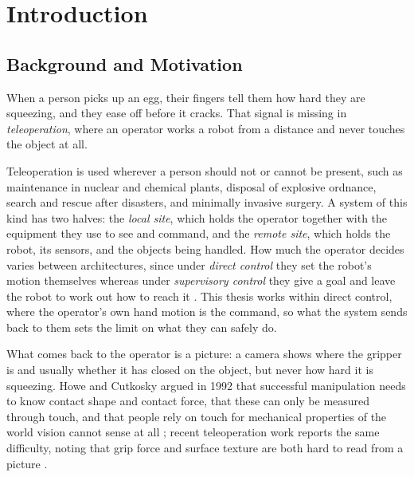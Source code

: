 \documentclass[12pt, a4paper, twoside, openright]{report}
\begin{document}
\tableofcontents
\cleardoublepage
\listoffigures
\cleardoublepage
\listoftables
\cleardoublepage

\setcounter{page}{1}

\chapter{Introduction}
\label{ch:introduction}

\section{Background and Motivation}
\label{sec:background}

When a person picks up an egg, their fingers tell them how hard they are
squeezing, and they ease off before it cracks. That signal is missing in
\emph{teleoperation}, where an operator works a robot from a distance and never
touches the object at all.

Teleoperation is used wherever a person should not or cannot be present, such
as maintenance in nuclear and chemical plants, disposal of explosive ordnance,
search and rescue after disasters, and minimally invasive surgery. A system of
this kind has two halves: the \emph{local site}, which holds the operator
together with the equipment they use to see and command, and the \emph{remote
    site}, which holds the robot, its sensors, and the objects being handled. How
much the operator decides varies between architectures, since under
\emph{direct control} they set the robot's motion themselves whereas under
\emph{supervisory control} they give a goal and leave the robot to work out
how to reach it \cite{niemeyer2016}. This thesis works within direct control,
where the operator's own hand motion is the command, so what the system sends
back to them sets the limit on what they can safely do.

What comes back to the operator is a picture: a camera shows where the gripper
is and usually whether it has closed on the object, but never how hard it is
squeezing. Howe and Cutkosky argued in 1992 that successful manipulation needs
to know contact shape and contact force, that these can only be measured
through touch, and that people rely on touch for mechanical properties of the
world vision cannot sense at all \cite{howe1992}; recent
teleoperation work reports the same difficulty, noting that grip force and
surface texture are both hard to read from a picture \cite{becker2024}.
\end{document}
